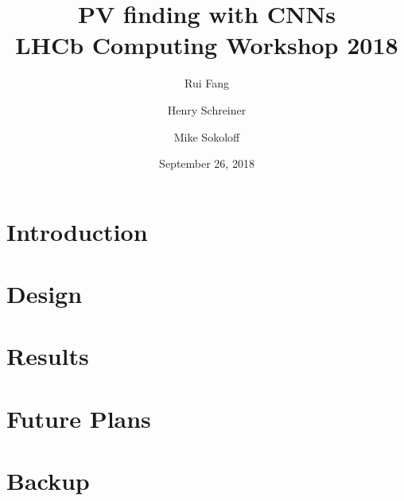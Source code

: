 \documentclass[aspectratio=169, 10pt]{beamer}
\title[PV finding with CNNs: LHCb Computing Workshop 2018]{PV finding with CNNs\\{\small LHCb Computing Workshop 2018}}
\author[Fang, Schreiner, Sokoloff]{Rui Fang \and Henry Schreiner \and Mike Sokoloff}
\institute{The University of Cincinnati}
\date{September 26, 2018}
\begin{document}
\begin{frame}
\titlepage
\end{frame}

\section{Introduction}


\section{Design}


\section{Results}


\section{Future Plans}


\backupbegin
\section{Backup}

\backupend
\end{document}
